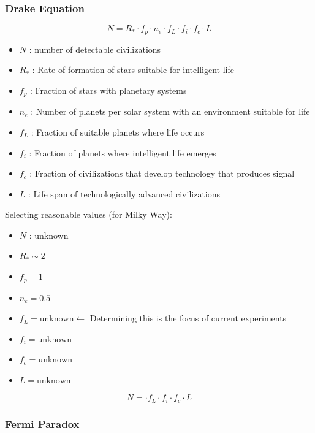 \documentclass{beamer}
\begin{document}
\begin{frame}
\frametitle{Drake Equation}
$$ N = R_{*} \cdot f_{p} \cdot n_{e} \cdot f_{L} \cdot f_{i} \cdot f_{c} \cdot L$$
\begin{itemize}
    \item $N$ : number of detectable civilizations 
    \item $R_{*}$ : Rate of formation of stars suitable for intelligent life
    \item $f_{p}$ : Fraction of stars with planetary systems
    \item $n_{e}$ : Number of planets per solar system with an environment suitable for life
    \item $f_{L}$ : Fraction of suitable planets where life occurs
    \item $f_{i}$ : Fraction of planets where intelligent life emerges
    \item $f_{c}$ : Fraction of civilizations that develop technology that produces signal
    \item $L$     : Life span of technologically advanced civilizations
\end{itemize}
\pause
Selecting reasonable values (for Milky Way): 
\begin{itemize}
    \item $N$ : unknown
    \item $R_{*} \sim 2$
    \item $f_{p} = 1$
    \item $n_{e} = 0.5$ %
    \item $f_{L} = \text{unknown} \leftarrow $ Determining this is the focus of current experiments
    \item $f_{i} = \text{unknown}$
    \item $f_{c} = \text{unknown}$ 
    \item $L     = \text{unknown}$ 
\end{itemize}
$$ N = \cdot f_{L} \cdot f_{i} \cdot f_{c} \cdot L$$
\end{frame}

\begin{frame}
\frametitle{Fermi Paradox}
\end{frame}
\end{document}
